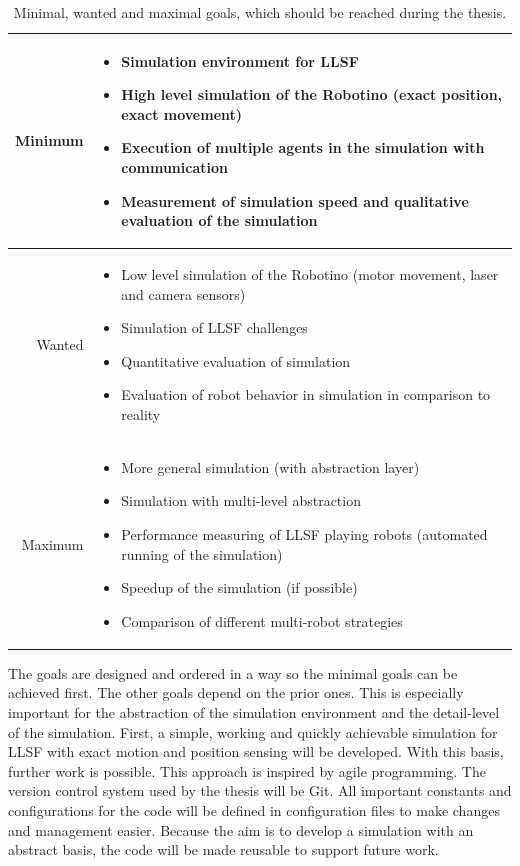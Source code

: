 \documentclass[11pt,a4paper]{article}
\begin{document}
\begin{table}
\begin{tabular}{|r||p{10cm}|}
\hline
Minimum & \begin{itemize}
\item Simulation environment for LLSF
\item High level simulation of the Robotino (exact position, exact movement)
\item Execution of multiple agents in the simulation with communication
\item Measurement of simulation speed and qualitative evaluation of the simulation
\end{itemize}\\ \hline
Wanted & \begin{itemize}
\item Low level simulation of the Robotino (motor movement, laser and camera sensors)
\item Simulation of LLSF challenges
\item Quantitative evaluation of simulation
\item Evaluation of robot behavior in simulation in comparison to reality
\end{itemize}\\ \hline
Maximum & \begin{itemize}
\item More general simulation (with abstraction layer)
\item Simulation with multi-level abstraction
\item Performance measuring of LLSF playing robots (automated running of the simulation)
\item Speedup of the simulation (if possible)
\item Comparison of different multi-robot strategies
\end{itemize}\\
\hline
\end{tabular}
\label{Table 1}
\caption{Minimal, wanted and maximal goals, which should be reached during the thesis.}
\end{table}
The goals are designed and ordered in a way so the minimal goals can be achieved first. The other goals depend on the prior ones. This is especially important for the abstraction of the simulation environment and the detail-level of the simulation. First, a simple, working and quickly achievable simulation for LLSF with exact motion and position sensing will be developed. With this basis, further work is possible. This approach is inspired by agile programming. The version control system used by the thesis will be Git. All important constants and configurations for the code will be defined in configuration files to make changes and management easier. Because the aim is to develop a simulation with an abstract basis, the code will be made reusable to support future work.\\
\end{document}
